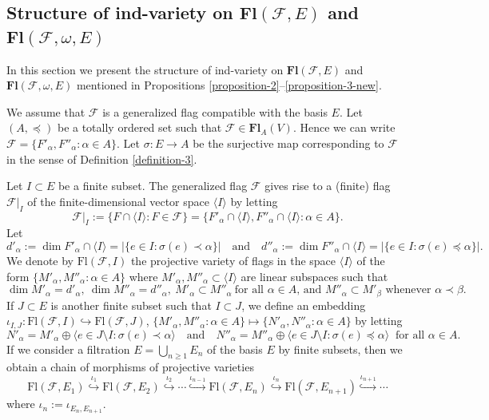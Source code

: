 \documentclass[12pt]{amsart}
\theoremstyle{definition}
\begin{document}
\subsection{Structure of ind-variety on $\mathbf{Fl}(\mathcal{F},E)$ and $\mathbf{Fl}(\mathcal{F},\omega,E)$}

\label{section-3-3}

In this section we present the structure of ind-variety on
$\mathbf{Fl}(\mathcal{F},E)$ and $\mathbf{Fl}(\mathcal{F},\omega,E)$
mentioned in Propositions \ref{proposition-2}--\ref{proposition-3-new}.

We assume that $\mathcal{F}$ is a generalized flag compatible with the basis $E$.
Let $(A,\preceq)$ be a totally ordered set
such that $\mathcal{F}\in\mathbf{Fl}_A(V)$. Hence we can write
$\mathcal{F}=\{F'_\alpha,F''_\alpha:\alpha\in A\}$. Let $\sigma:E\to A$
be the surjective map corresponding to $\mathcal{F}$ in the sense of Definition \ref{definition-3}.

Let $I\subset E$ be a finite subset. The generalized flag $\mathcal{F}$
gives rise to a (finite) flag $\mathcal{F}|_I$ of the finite-dimensional vector space $\langle I\rangle$
by letting
\[\mathcal{F}|_I:=\{F\cap\langle I\rangle:F\in\mathcal{F}\}=
\{F'_\alpha\cap\langle I\rangle,F''_\alpha\cap\langle I\rangle:\alpha\in A\}.\]
Let
\[d'_\alpha:=\dim F'_\alpha\cap\langle I\rangle=|\{e\in I:\sigma(e)\prec \alpha\}|\quad
\mbox{and}\quad
d''_\alpha:=\dim F''_\alpha\cap\langle I\rangle=|\{e\in I:\sigma(e)\preceq \alpha\}|.\]
We denote by $\mathrm{Fl}(\mathcal{F},I)$ the projective variety of flags in the space $\langle I\rangle$ of the form $\{M'_\alpha,M''_\alpha:\alpha\in A\}$
where $M'_\alpha,M''_\alpha\subset\langle I\rangle$ are linear subspaces such that
\[\dim M'_\alpha=d'_\alpha,\ \dim M''_\alpha=d''_\alpha,\ M'_\alpha\subset M''_\alpha\ \mbox{for all $\alpha\in A$, and }M''_\alpha\subset M'_\beta\mbox{ whenever $\alpha\prec\beta$}.\]
If $J\subset E$ is another finite subset such that $I\subset J$, we define an embedding $\iota_{I,J}:\mathrm{Fl}(\mathcal{F},I)\hookrightarrow \mathrm{Fl}(\mathcal{F},J)$, $\{M'_\alpha,M''_\alpha:\alpha\in A\}\mapsto\{N'_\alpha,N''_\alpha:\alpha\in A\}$ by letting
\[N'_\alpha=M'_\alpha\oplus\langle e\in J\setminus I:\sigma(e)\prec\alpha\rangle
\quad\mbox{and}\quad
N''_\alpha=M''_\alpha\oplus\langle e\in J\setminus I:\sigma(e)\preceq\alpha\rangle\ \mbox{ for all $\alpha\in A$}.\]
If we consider a filtration $E=\bigcup_{n\geq 1}E_n$ of the basis $E$ by finite subsets,
then we obtain a chain of morphisms of projective varieties
\begin{equation}
\label{rel8-newnew}
\mathrm{Fl}(\mathcal{F},E_1)
\stackrel{\iota_1}{\hookrightarrow} \mathrm{Fl}(\mathcal{F},E_2)
\stackrel{\iota_2}{\hookrightarrow}\cdots\stackrel{\iota_{n-1}}{\hookrightarrow}
\mathrm{Fl}(\mathcal{F},E_n)\stackrel{\iota_n}{\hookrightarrow} \mathrm{Fl}(\mathcal{F},E_{n+1})\stackrel{\iota_{n+1}}{\hookrightarrow}\cdots
\end{equation}
where $\iota_n:=\iota_{E_n,E_{n+1}}$.
\end{document}
